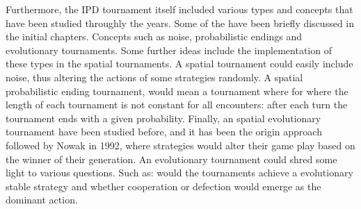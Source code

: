 Furthermore, the IPD tournament itself included various types and concepts that
have been studied throughly the years. Some of the have been briefly discussed
in the initial chapters. Concepts such as noise, probabilistic endings and evolutionary
tournaments. Some further ideas include the implementation of these types in the
spatial tournaments. A spatial tournament could easily include noise, thus altering
the actions of some strategies randomly. A spatial probabilistic ending tournament,
would mean a tournament where for where the length of each tournament is not
constant for all encounters: after each turn the tournament ends with a given
probability. Finally, an spatial evolutionary tournament have been studied before,
and it has been the origin approach followed by Nowak in 1992, where strategies
would alter their game play based on the winner of their generation. An evolutionary
tournament could shred some light to various questions. Such as: would the
tournaments achieve a evolutionary stable strategy and whether cooperation or defection would emerge as
the dominant action.
